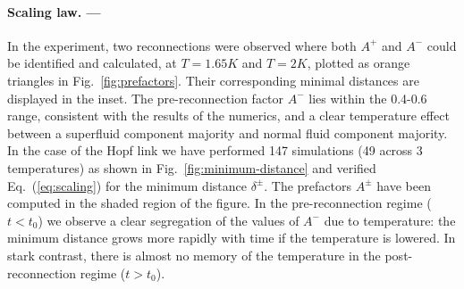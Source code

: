 \documentclass[%
 reprint,
 amsmath,amssymb,
 aps,
 prl,
]{revtex4-2}
\def\red#1{\textcolor{red}{#1}}
\begin{document}
\paragraph*{Scaling law. ---}In the experiment, two reconnections were observed where both $A^+$ and $A^-$ could be identified and calculated, at $T=1.65K$ and $T=2K$, plotted as orange triangles in Fig.~\ref{fig:prefactors}. Their corresponding minimal distances are displayed in the inset.
%
The pre-reconnection factor $A^-$ lies within the 0.4-0.6 range, consistent with the results of the numerics, and a clear temperature effect between a superfluid component majority and normal fluid component majority.
In the case of the Hopf link 
we have performed 147 simulations 
(49 across 3 temperatures) as shown in Fig.~\ref{fig:minimum-distance} and
verified Eq.~(\ref{eq:scaling}) for the minimum distance $\delta^{\pm}$. 
The prefactors $A^{\pm}$ have been computed in the shaded region 
of the figure. In the pre-reconnection regime ($t<t_0$) we observe
a clear segregation of the values of $A^-$ due to temperature: 
the minimum distance grows more rapidly with time if the temperature is
lowered. 
In stark contrast, there is almost no memory of the temperature in the
post-reconnection regime ($t>t_0$). 
\end{document}
